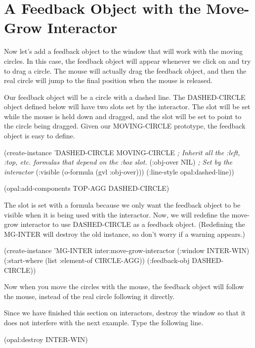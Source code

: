 \section{A Feedback Object with the Move-Grow Interactor}

Now let's add a feedback object to the window that will work with the
moving circles.  In this case, the feedback object will appear
whenever we click on and try to drag a circle.  The mouse will
actually drag the feedback object, and then the real circle will jump
to the final position when the mouse is released.

Our feedback object will be a circle with a dashed line.  The
DASHED-CIRCLE object defined below will have two slots set by the
interactor.  The  slot will be set while the mouse is held
down and dragged, and the  slot will be set to point to the
circle being dragged.  Given our MOVING-CIRCLE prototype, the feedback
object is easy to define.

\begin{programexample}
(create-instance 'DASHED-CIRCLE MOVING-CIRCLE
   {\it ; Inherit all the :left, :top, etc. formulas that depend on the :box slot.}
   (:obj-over NIL)  {\it ; Set by the interactor}
   (:visible (o-formula (gvl :obj-over)))
   (:line-style opal:dashed-line))

(opal:add-components TOP-AGG DASHED-CIRCLE)
\end{programexample}

The  slot is set with a formula because we only want the
feedback object to be visible when it is being used with the
interactor.  Now, we will redefine the move-grow interactor to use
DASHED-CIRCLE as a feedback object.  (Redefining the MG-INTER will
destroy the old instance, so don't worry if a warning appears.)

\begin{programexample}
(create-instance 'MG-INTER inter:move-grow-interactor
   (:window INTER-WIN)
   (:start-where (list :element-of CIRCLE-AGG))
   (:feedback-obj DASHED-CIRCLE))
\end{programexample}

Now when you move the circles with the mouse, the feedback object will
follow the mouse, instead of the real circle following it directly.

Since we have finished this section on interactors, destroy the window
so that it does not interfere with the next example.  Type the
following line.

\begin{programexample}
(opal:destroy INTER-WIN)
\end{programexample}


